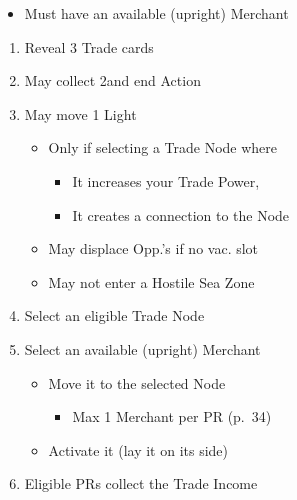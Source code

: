 \documentclass[10pt]{article}
\begin{document}
\begin{itemize}
	\item Must have an available (upright) Merchant
\end{itemize}
\begin{enumerate}
	\item Reveal 3 Trade cards
	\item May collect 2\ducats and end Action
	\item May move 1 Light \ship
	\begin{itemize}
		\item Only if selecting a Trade Node where
		\begin{itemize}
			\item It increases your Trade Power, 
			\item It creates a connection to the Node
		\end{itemize}
		\item May displace Opp.'s \ship if no vac. slot
		\item May not enter a Hostile Sea Zone
	\end{itemize}
	\item Select an eligible Trade Node
	\item Select an available (upright) Merchant
	\begin{itemize}
		\item Move it to the selected Node
		\begin{itemize}
			\item Max 1 Merchant per PR (p.~34)
		\end{itemize}
		\item Activate it (lay it on its side)
	\end{itemize}
	\item Eligible PRs collect the Trade Income
\end{enumerate}
\end{document}
